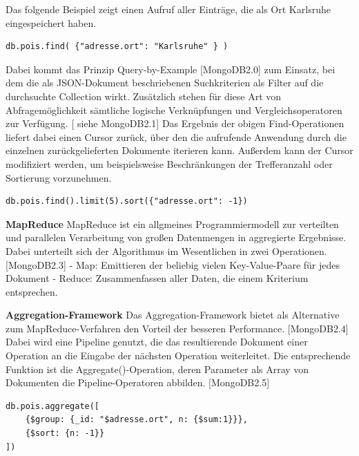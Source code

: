 Das folgende Beispiel zeigt einen Aufruf aller Einträge, die als Ort Karlsruhe eingespeichert haben. 
\newline
\begin{lstlisting}
db.pois.find( {"adresse.ort": "Karlsruhe" } )
\end{lstlisting}

Dabei kommt das Prinzip Query-by-Example [MongoDB2.0] zum Einsatz, bei dem die als JSON-Dokument beschriebenen Suchkriterien als Filter auf die durchsuchte Collection wirkt. Zusätzlich stehen für diese Art von Abfragemöglichkeit sämtliche logische Verknüpfungen und Vergleichsoperatoren zur Verfügung.  [ siehe MongoDB2.1]
Das Ergebnis der obigen Find-Operationen liefert dabei einen Cursor zurück, über den die aufrufende Anwendung durch die einzelnen zurückgelieferten Dokumente iterieren kann. Außerdem kann der Cursor modifiziert werden, um beispielsweise Beschränkungen der Trefferanzahl oder Sortierung vorzunehmen.
\newline
\begin{lstlisting}
db.pois.find().limit(5).sort({"adresse.ort": -1})
\end{lstlisting}


\textbf{MapReduce}
\newline
MapReduce ist ein allgmeines Programmiermodell zur verteilten und parallelen Verarbeitung von großen Datenmengen in aggregierte Ergebnisse. Dabei unterteilt sich der Algorithmus im Wesentlichen in zwei Operationen. [MongoDB2.3]
\newline
-	Map: Emittieren der beliebig vielen Key-Value-Paare für jedes Dokument
\newline
-	Reduce: Zusammenfassen aller Daten, die einem Kriterium entsprechen.
\newline

\textbf{Aggregation-Framework}
\newline
Das Aggregation-Framework bietet als Alternative zum MapReduce-Verfahren den Vorteil der besseren Performance. [MongoDB2.4] Dabei wird eine Pipeline genutzt, die das resultierende Dokument einer Operation an die Eingabe der nächsten Operation weiterleitet. Die entsprechende Funktion ist die Aggregate()-Operation, deren Parameter als Array von Dokumenten die Pipeline-Operatoren abbilden. [MongoDB2.5]
\newline 

\begin{lstlisting}
db.pois.aggregate([
    {$group: {_id: "$adresse.ort", n: {$sum:1}}},
    {$sort: {n: -1}}
])
\end{lstlisting}


